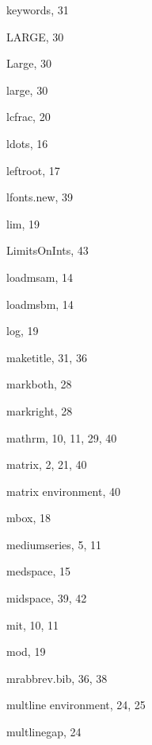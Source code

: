 \begin{theindex}
  \indexspace

  \item {\ptt \bslash keywords}, 31

  \indexspace

  \item {\ptt \bslash LARGE}, 30
  \item {\ptt \bslash Large}, 30
  \item {\ptt \bslash large}, 30
  \item {\ptt \bslash lcfrac}, 20
  \item {\ptt \bslash ldots}, 16
  \item {\ptt \bslash leftroot}, 17
  \item {\ptt {}lfonts.new}, 39
  \item {\ptt \bslash lim}, 19
  \item {\ptt \bslash LimitsOnInts}, 43
  \item {\ptt \bslash loadmsam}, 14
  \item {\ptt \bslash loadmsbm}, 14
  \item {\ptt \bslash log}, 19

  \indexspace

  \item {\ptt \bslash maketitle}, 31, 36
  \item {\ptt \bslash markboth}, 28
  \item {\ptt \bslash markright}, 28
  \item {\ptt \bslash mathrm}, 10, 11, 29, 40
  \item {\ptt \bslash matrix}, 2, 21, 40
  \item {\ptt {}matrix} environment, 40
  \item {\ptt \bslash mbox}, 18
  \item {\ptt \bslash mediumseries}, 5, 11
  \item {\ptt \bslash medspace}, 15
  \item {\ptt \bslash midspace}, 39, 42
  \item {\ptt \bslash mit}, 10, 11
  \item {\ptt \bslash mod}, 19
  \item {\ptt {}mrabbrev.bib}, 36, 38
  \item {\ptt {}multline} environment, 24, 25
  \item {\ptt \bslash multlinegap}, 24

  \indexspace


\end{theindex}
